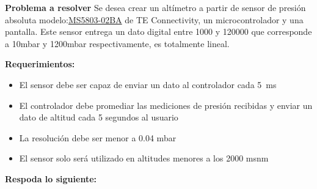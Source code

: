 \documentclass[12pt]{article}
\begin{document}
\setlength{\parindent}{0em}

\noindent\textbf{Problema a resolver}
\newline
\newline
Se desea crear un altímetro a partir de sensor de presión absoluta modelo:\href{https://www.te.com/commerce/DocumentDelivery/DDEController?Action=srchrtrv&DocNm=MS5803-02BA&DocType=Data+Sheet&DocLang=English}{MS5803-02BA} de TE Connectivity, un microcontrolador y una pantalla. Este sensor entrega un dato digital entre 1000 y 120000 que corresponde a 10mbar y 1200mbar respectivamente, es totalmente lineal. 

\vspace{0.5cm}
\noindent\textbf{Requerimientos:}
\begin{itemize}
    \item El sensor debe ser capaz de enviar un dato al controlador cada \SI{5}{\milli\second}
    \item El controlador debe promediar las mediciones de presión recibidas y enviar un dato de altitud cada 5 segundos al usuario
    \item La resolución debe ser menor a 0.04 \si{\milli bar}
    \item El sensor solo será utilizado en altitudes menores a los 2000 msnm
\end{itemize}

\noindent\textbf{Respoda lo siguiente:}
\end{document}
